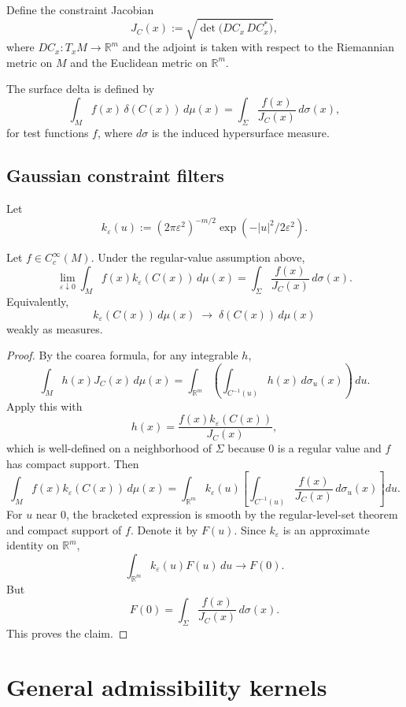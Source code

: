 \documentclass[11pt]{article}
\begin{document}
Define the constraint Jacobian
\[
J_C(x):=\sqrt{\det\bigl(DC_x\,DC_x^{\ast}\bigr)},
\]
where \(DC_x:T_xM\to\mathbb R^m\) and the adjoint is taken with respect to the Riemannian
metric on \(M\) and the Euclidean metric on \(\mathbb R^m\).

The surface delta is defined by
\[
\int_M f(x)\,\delta(C(x))\,d\mu(x)
=
\int_{\Sigma}\frac{f(x)}{J_C(x)}\,d\sigma(x),
\]
for test functions \(f\), where \(d\sigma\) is the induced hypersurface measure.

\subsection{Gaussian constraint filters}

Let
\[
k_\varepsilon(u):=(2\pi\varepsilon^2)^{-m/2}\exp(-|u|^2/2\varepsilon^2).
\]

\begin{theorem}
Let \(f\in C_c^\infty(M)\).  Under the regular-value assumption above,
\[
\lim_{\varepsilon\downarrow0}
\int_M f(x) k_\varepsilon(C(x))\,d\mu(x)
=
\int_{\Sigma}\frac{f(x)}{J_C(x)}\,d\sigma(x).
\]
Equivalently,
\[
k_\varepsilon(C(x))\,d\mu(x)\;\longrightarrow\;\delta(C(x))\,d\mu(x)
\]
weakly as measures.
\end{theorem}

\begin{proof}
By the coarea formula, for any integrable \(h\),
\[
\int_M h(x)J_C(x)\,d\mu(x)
=
\int_{\mathbb R^m}
\left(\int_{C^{-1}(u)} h(x)\,d\sigma_u(x)\right)\,du .
\]
Apply this with
\[
h(x)=\frac{f(x)k_\varepsilon(C(x))}{J_C(x)} ,
\]
which is well-defined on a neighborhood of \(\Sigma\) because \(0\) is a regular value and
\(f\) has compact support.  Then
\[
\int_M f(x)k_\varepsilon(C(x))\,d\mu(x)
=
\int_{\mathbb R^m} k_\varepsilon(u)
\left[
\int_{C^{-1}(u)}
\frac{f(x)}{J_C(x)}\,d\sigma_u(x)
\right]du .
\]
For \(u\) near \(0\), the bracketed expression is smooth by the regular-level-set theorem
and compact support of \(f\).  Denote it by \(F(u)\).  Since \(k_\varepsilon\) is an approximate
identity on \(\mathbb R^m\),
\[
\int_{\mathbb R^m} k_\varepsilon(u)F(u)\,du\to F(0).
\]
But
\[
F(0)=\int_{\Sigma}\frac{f(x)}{J_C(x)}\,d\sigma(x).
\]
This proves the claim.
\end{proof}

\section{General admissibility kernels}
\end{document}
